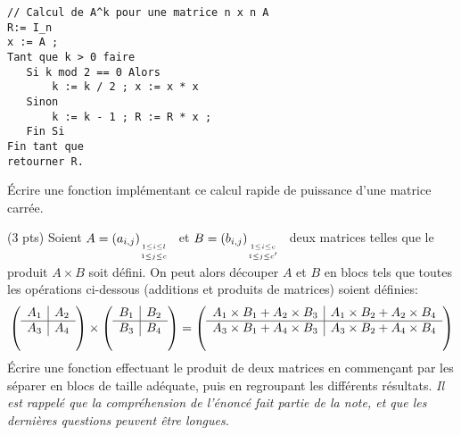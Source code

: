 \begin{verbatim}
// Calcul de A^k pour une matrice n x n A
R:= I_n
x := A ;
Tant que k > 0 faire
   Si k mod 2 == 0 Alors
       k := k / 2 ; x := x * x
   Sinon
       k := k - 1 ; R := R * x ;
   Fin Si
Fin tant que
retourner R.
\end{verbatim}
{\'E}crire une fonction impl{\'e}mentant ce calcul rapide de puissance d'une
matrice carr{\'e}e.

\question (3 pts) Soient $A=\matrice alc$ et $B=\matrice bc{c'}$ deux
matrices telles que le produit $A\times B$ soit d{\'e}fini. On peut alors
d{\'e}couper $A$ et $B$ en blocs tels que toutes les op{\'e}rations ci-dessous
(additions et produits de matrices) soient d{\'e}finies:
$$
\left(
  \begin{array}[b]{c|c}
    A_1 & A_2\\
    \hline
    A_3 & A_4
  \end{array}
\right) \times
\left(
  \begin{array}[b]{c|c}
    B_1 & B_2\\
    \hline
    B_3 & B_4
  \end{array}
\right) =
\left(
  \begin{array}[b]{c|c}
    A_1\times B_1 + A_2\times B_3 & 
    A_1\times B_2 + A_2 \times B_4 \\
    \hline
    A_3\times B_1 + A_4\times B_3 & 
    A_3\times B_2 + A_4 \times B_4 
  \end{array}
\right) 
$$ 
{\'E}crire une fonction effectuant le produit de deux matrices en
commen{\c c}ant par les s{\'e}parer en blocs de taille ad{\'e}quate, puis en
regroupant les diff{\'e}rents r{\'e}sultats. \emph{Il est rappel{\'e} que la
  compr{\'e}hension de l'{\'e}nonc{\'e} fait partie de la note, et que les
  derni{\`e}res questions peuvent {\^e}tre longues.}
